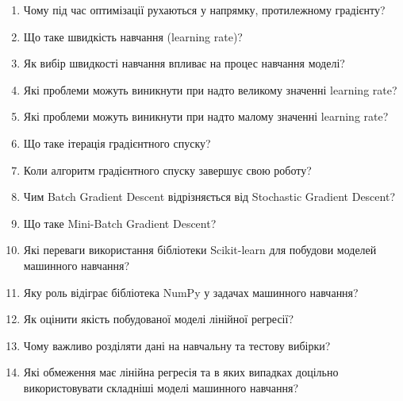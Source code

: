 \begin{enumerate}
\item Чому під час оптимізації рухаються у напрямку, протилежному градієнту?
\item Що таке швидкість навчання (learning rate)?
\item Як вибір швидкості навчання впливає на процес навчання моделі?
\item Які проблеми можуть виникнути при надто великому значенні learning rate?
\item Які проблеми можуть виникнути при надто малому значенні learning rate?
\item Що таке ітерація градієнтного спуску?
\item Коли алгоритм градієнтного спуску завершує свою роботу?
\item Чим Batch Gradient Descent відрізняється від Stochastic Gradient Descent?
\item Що таке Mini-Batch Gradient Descent?
\item Які переваги використання бібліотеки Scikit-learn для побудови моделей машинного навчання?
\item Яку роль відіграє бібліотека NumPy у задачах машинного навчання?
\item Як оцінити якість побудованої моделі лінійної регресії?
\item Чому важливо розділяти дані на навчальну та тестову вибірки?
\item Які обмеження має лінійна регресія та в яких випадках доцільно використовувати складніші моделі машинного навчання?
\end{enumerate}